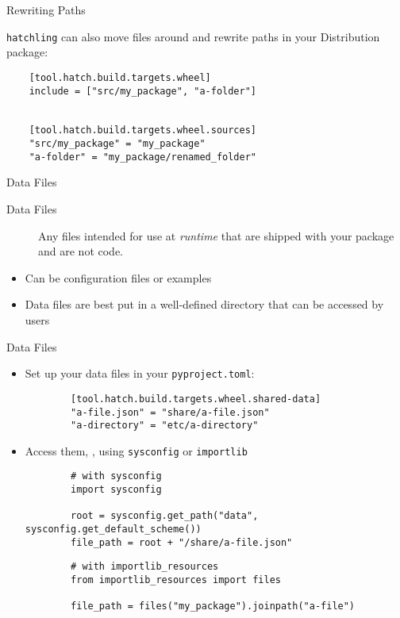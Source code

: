 \begin{darkframe}[fragile]{Rewriting Paths}
  \begin{center}
    \Large\textcolor{ccyan}{\texttt{hatchling} can also move files around and rewrite paths in your Distribution package:}
  \end{center}
  \begin{verbatim}
    [tool.hatch.build.targets.wheel]
    include = ["src/my_package", "a-folder"]


    [tool.hatch.build.targets.wheel.sources]
    "src/my_package" = "my_package"
    "a-folder" = "my_package/renamed_folder"
  \end{verbatim}
\end{darkframe}

\begin{frame}{Data Files}
  \begin{description}
    \item [Data Files] Any files intended for use at \emph{runtime} that are shipped with your package
    and are not code.
  \end{description}

  \begin{itemize}
    \setlength{\itemsep}{1em}
    \item [\to] Can be configuration files or examples
    \item [\to] Data files are best put in a well-defined directory that can be accessed by users
  \end{itemize}
\end{frame}

\begin{darkframe}{Data Files}
  \begin{itemize}
    \item Set up your data files in your \texttt{pyproject.toml}:
      \begin{verbatim}
        [tool.hatch.build.targets.wheel.shared-data]
        "a-file.json" = "share/a-file.json"
        "a-directory" = "etc/a-directory"
      \end{verbatim}
    \item Access them, \eg, using \texttt{sysconfig} or \texttt{importlib}
      \begin{verbatim}
        # with sysconfig
        import sysconfig

        root = sysconfig.get_path("data", sysconfig.get_default_scheme())
        file_path = root + "/share/a-file.json"
      \end{verbatim}
      \vspace{1.5em}
      
      \begin{verbatim}
        # with importlib_resources
        from importlib_resources import files

        file_path = files("my_package").joinpath("a-file")
      \end{verbatim}
  \end{itemize}
\end{darkframe}

